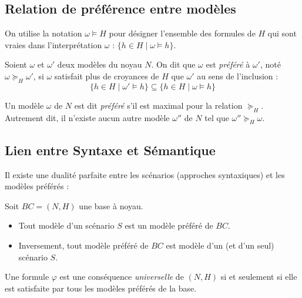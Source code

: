 \subsection{Relation de préférence entre modèles}

On utilise la notation $\omega \models H$ pour désigner l'ensemble des formules de $H$ qui sont vraies dans 
l'interprétation $\omega$ : $\{ h \in H \mid \omega \models h \}$.

\begin{definition}
    Soient $\omega$ et $\omega'$ deux modèles du noyau $N$. On dit que $\omega$ est \emph{préféré} à $\omega'$, 
    noté $\omega \succeq_H \omega'$, si $\omega$ satisfait plus de croyances de $H$ que $\omega'$ au sens de l'inclusion :
        $$ \{ h \in H \mid \omega' \models h \} \subseteq \{ h \in H \mid \omega \models h \} $$
\end{definition}

\begin{definition}
    Un modèle $\omega$ de $N$ est dit \emph{préféré} s'il est maximal pour la relation $\succeq_H$. Autrement dit, il 
    n'existe aucun autre modèle $\omega''$ de $N$ tel que $\omega'' \succeq_H \omega$.
\end{definition}

\subsection{Lien entre Syntaxe et Sémantique}

Il existe une dualité parfaite entre les scénarios (approches syntaxiques) et les modèles préférés :

\begin{theorem}
    Soit $BC = (N, H)$ une base à noyau.
    \begin{itemize}
        \item Tout modèle d'un scénario $S$ est un modèle préféré de $BC$.
        \item Inversement, tout modèle préféré de $BC$ est modèle d'un (et d'un seul) scénario $S$.
    \end{itemize}
\end{theorem}

\begin{remark}
    Une formule $\varphi$ est une conséquence \emph{universelle} de $(N, H)$ si et seulement si elle est satisfaite 
    par tous les modèles préférés de la base.
\end{remark}





